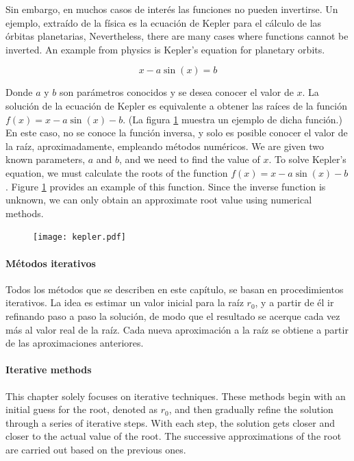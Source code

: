 \begin{paracol}{2}
Sin embargo, en muchos casos de interés las funciones no pueden invertirse.  Un ejemplo, extraído de la física es la ecuación de Kepler para el cálculo de las órbitas planetarias,
\switchcolumn
Nevertheless, there are many cases where functions cannot be inverted. An example from physics is Kepler's equation for planetary orbits.  
\end{paracol}
\begin{equation*}
x-a\sin(x)=b
\end{equation*}
\begin{paracol}{2}
Donde $a$ y $b$ son parámetros conocidos y se desea conocer el valor de $x$. La solución de la ecuación de Kepler es equivalente a obtener las raíces de la función $f(x)=x-a\sin(x)-b$. (La figura \ref{fig:kepler} muestra un ejemplo de dicha función.) En este caso, no se conoce la función inversa, y solo es posible conocer el valor de la raíz, aproximadamente, empleando métodos numéricos.
\switchcolumn
We are given two known parameters, $a$ and $b$, and we need to find the value of $x$. To solve Kepler's equation, we must calculate the roots of the function $f(x) = x - a\sin(x) - b$. Figure \ref{fig:kepler} provides an example of this function. Since the inverse function is unknown, we can only obtain an approximate root value using numerical methods.  
\end{paracol}
\begin{figure}[h]
\centering
	\texttt{[image: kepler.pdf]}
	\label{fig:kepler}
\end{figure}
\begin{paracol}{2}

\paragraph*{Métodos iterativos} 
Todos los métodos que se describen en este capítulo, se basan en procedimientos iterativos. La idea es estimar un valor inicial para la raíz $r_0$, y a partir de él ir refinando paso a paso la solución, de modo que el resultado se acerque cada vez más al valor real de la raíz. Cada nueva aproximación a la raíz se obtiene a partir de las aproximaciones anteriores.
\switchcolumn
\paragraph*{Iterative methods} This chapter solely focuses on iterative techniques. These methods begin with an initial guess for the root, denoted as $r_0$, and then gradually refine the solution through a series of iterative steps. With each step, the solution gets closer and closer to the actual value of the root. The successive approximations of the root are carried out based on the previous ones. 
\end{paracol}
